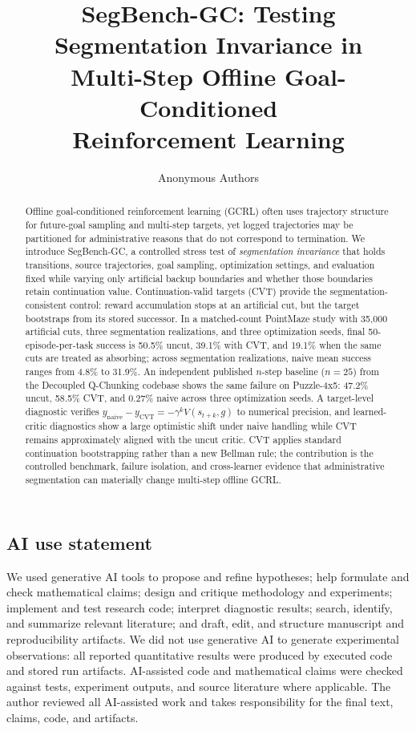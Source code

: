 \documentclass{article}
\title{SegBench-GC: Testing Segmentation Invariance in\\ Multi-Step Offline Goal-Conditioned\\ Reinforcement Learning}
\author{Anonymous Authors}
\begin{document}
\maketitle

\begin{abstract}
Offline goal-conditioned reinforcement learning (GCRL) often uses trajectory structure for future-goal sampling and multi-step targets, yet logged trajectories may be partitioned for administrative reasons that do not correspond to termination. We introduce SegBench-GC, a controlled stress test of \emph{segmentation invariance} that holds transitions, source trajectories, goal sampling, optimization settings, and evaluation fixed while varying only artificial backup boundaries and whether those boundaries retain continuation value. Continuation-valid targets (CVT) provide the segmentation-consistent control: reward accumulation stops at an artificial cut, but the target bootstraps from its stored successor. In a matched-count PointMaze study with 35,000 artificial cuts, three segmentation realizations, and three optimization seeds, final 50-episode-per-task success is 50.5\% uncut, 39.1\% with CVT, and 19.1\% when the same cuts are treated as absorbing; across segmentation realizations, naive mean success ranges from 4.8\% to 31.9\%. An independent published $n$-step baseline ($n=25$) from the Decoupled Q-Chunking codebase shows the same failure on Puzzle-4x5: 47.2\% uncut, 58.5\% CVT, and 0.27\% naive across three optimization seeds. A target-level diagnostic verifies $y_{\mathrm{naive}}-y_{\mathrm{CVT}}=-\gamma^k V(s_{t+k},g)$ to numerical precision, and learned-critic diagnostics show a large optimistic shift under naive handling while CVT remains approximately aligned with the uncut critic. CVT applies standard continuation bootstrapping rather than a new Bellman rule; the contribution is the controlled benchmark, failure isolation, and cross-learner evidence that administrative segmentation can materially change multi-step offline GCRL.
\end{abstract}








\label{sec:main-text-end}

\subsection*{AI use statement}
We used generative AI tools to propose and refine hypotheses; help formulate and check mathematical claims; design and critique methodology and experiments; implement and test research code; interpret diagnostic results; search, identify, and summarize relevant literature; and draft, edit, and structure manuscript and reproducibility artifacts. We did not use generative AI to generate experimental observations: all reported quantitative results were produced by executed code and stored run artifacts. AI-assisted code and mathematical claims were checked against tests, experiment outputs, and source literature where applicable. The author reviewed all AI-assisted work and takes responsibility for the final text, claims, code, and artifacts.






\appendix

\end{document}
